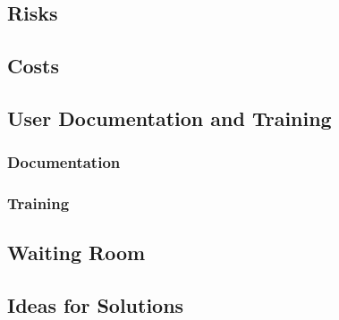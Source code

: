 \documentclass{article}
\begin{document}
\subsection{Risks}
\subsection{Costs}
\subsection{User Documentation and Training}
\subsubsection{Documentation}
\subsubsection{Training}
\subsection{Waiting Room}
\subsection{Ideas for Solutions}
\end{document}
